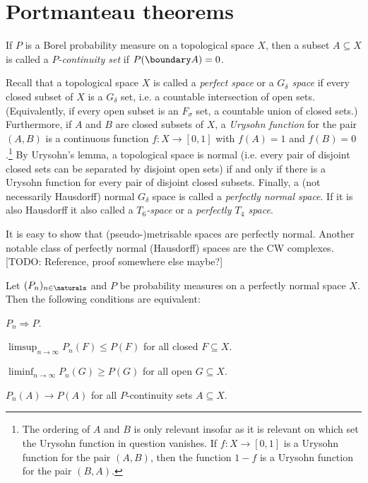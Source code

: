\documentclass[article, a4paper, 11pt, oneside]{memoir}
\numberwithin{equation}{chapter}
\newcommand{\wto}{\Rightarrow}
\begin{document}


\chapter{Portmanteau theorems}

If $P$ is a Borel probability measure on a topological space $X$, then a subset $A \subseteq X$ is called a \emph{$P$-continuity set} if $P(\boundary A) = 0$.

Recall that a topological space $X$ is called a \emph{perfect space} or a \emph{$G_\delta$ space} if every closed subset of $X$ is a $G_\delta$ set, i.e. a countable intersection of open sets. (Equivalently, if every open subset is an $F_\sigma$ set, a countable union of closed sets.) Furthermore, if $A$ and $B$ are closed subsets of $X$, a \emph{Urysohn function} for the pair $(A,B)$ is a continuous function $f \colon X \to [0,1]$ with $f(A) = 1$ and $f(B) = 0$.\footnote{The ordering of $A$ and $B$ is only relevant insofar as it is relevant on which set the Urysohn function in question vanishes. If $f \colon X \to [0,1]$ is a Urysohn function for the pair $(A,B)$, then the function $1-f$ is a Urysohn function for the pair $(B,A)$.} By Urysohn's lemma, a topological space is normal (i.e. every pair of disjoint closed sets can be separated by disjoint open sets) if and only if there is a Urysohn function for every pair of disjoint closed subsets. Finally, a (not necessarily Hausdorff) normal $G_\delta$ space is called a \emph{perfectly normal space}. If it is also Hausdorff it also called a \emph{$T_6$-space} or a \emph{perfectly $T_4$ space}.

It is easy to show that (pseudo-)metrisable spaces are perfectly normal. Another notable class of perfectly normal (Hausdorff) spaces are the CW complexes. [TODO: Reference, proof somewhere else maybe?]

\begin{theorem}
    Let $(P_n)_{n\in\naturals}$ and $P$ be probability measures on a perfectly normal space $X$. Then the following conditions are equivalent:
    \begin{enumthm}
        \item \label{enum:portmanteau-weak-convergence} $P_n \wto P$.

        \item \label{enum:portmanteau-closed} $\limsup_{n\to\infty} P_n(F) \leq P(F)$ for all closed $F \subseteq X$.

        \item \label{enum:portmanteau-open} $\liminf_{n\to\infty} P_n(G) \geq P(G)$ for all open $G \subseteq X$.

        \item \label{enum:portmanteau-continuity-sets} $P_n(A) \to P(A)$ for all $P$-continuity sets $A \subseteq X$.
    \end{enumthm}
\end{theorem}
\end{document}
